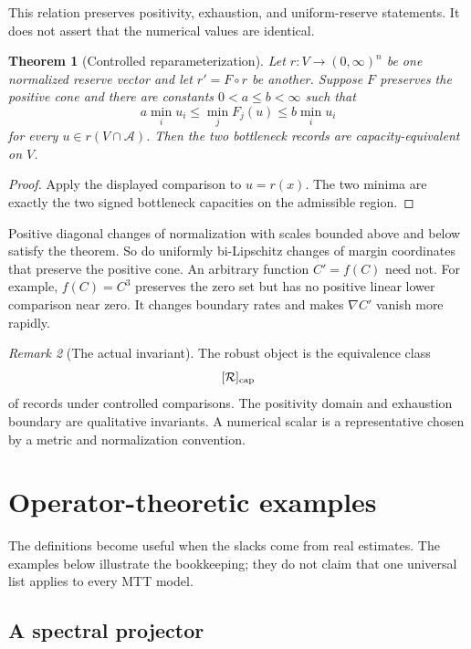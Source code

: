\documentclass[11pt]{article}
\newtheorem{theorem}{Theorem}[section]
\theoremstyle{definition}
\theoremstyle{remark}
\newtheorem{remark}[theorem]{Remark}
\newcommand{\cA}{\mathcal A}
\newcommand{\cR}{\mathcal R}
\begin{document}
This relation preserves positivity, exhaustion, and uniform-reserve
statements.  It does not assert that the numerical values are identical.

\begin{theorem}[Controlled reparameterization]
\label{thm:reparam}
Let \(r:V\to(0,\infty)^n\) be one normalized reserve vector and let
\(r'=F\circ r\) be another.  Suppose \(F\) preserves the positive cone and
there are constants \(0<a\le b<\infty\) such that
\[
 a\min_i u_i
 \le
 \min_jF_j(u)
 \le
 b\min_i u_i
\]
for every \(u\in r(V\cap\cA)\).  Then the two bottleneck records are
capacity-equivalent on \(V\).
\end{theorem}

\begin{proof}
Apply the displayed comparison to \(u=r(x)\).  The two minima are exactly
the two signed bottleneck capacities on the admissible region.
\end{proof}

Positive diagonal changes of normalization with scales bounded above and
below satisfy the theorem.  So do uniformly bi-Lipschitz changes of margin
coordinates that preserve the positive cone.  An arbitrary function
\(C'=f(C)\) need not.  For example, \(f(C)=C^3\) preserves the zero set but
has no positive linear lower comparison near zero.  It changes boundary
rates and makes \(\nabla C'\) vanish more rapidly.

\begin{remark}[The actual invariant]
The robust object is the equivalence class
\[
 [\cR]_{\rm cap}
\]
of records under controlled comparisons.  The positivity domain and
exhaustion boundary are qualitative invariants.  A numerical scalar is a
representative chosen by a metric and normalization convention.
\end{remark}

\section{Operator-theoretic examples}
\label{sec:examples}

The definitions become useful when the slacks come from real estimates.
The examples below illustrate the bookkeeping; they do not claim that one
universal list applies to every MTT model.

\subsection{A spectral projector}
\end{document}
